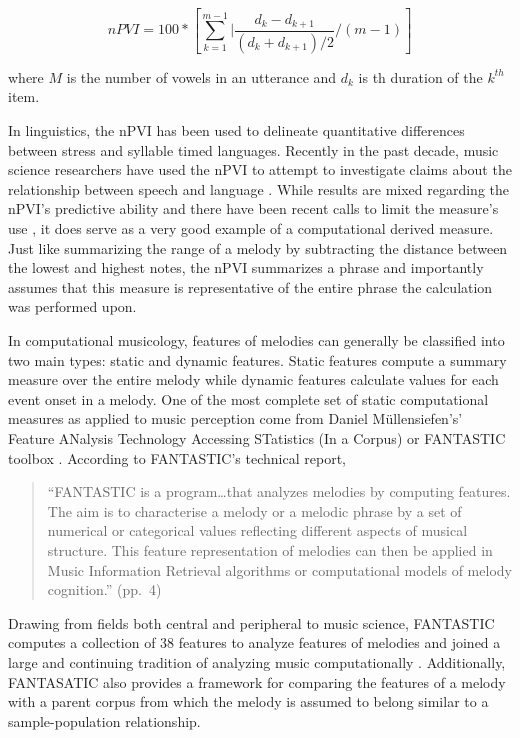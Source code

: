 \documentclass[]{book}
\begin{document}
\[nPVI = 100 * [\sum_{k=1}^{m-1} | \frac{d_k - d_{k+1}}{(d_k + d_{k+1})/2}/(m-1)] \]

where \(M\) is the number of vowels in an utterance and \(d_k\) is th duration of the \(k^{th}\) item. \citep{vanhandelRoleMeterCompositional2010}

In linguistics, the nPVI has been used to delineate quantitative differences between stress and syllable timed languages.
Recently in the past decade, music science researchers have used the nPVI to attempt to investigate claims about the relationship between speech and language \citep{danieleINTERPLAYLINGUISTICHISTORICAL2004, patelStressTimedVsSyllableTimed2003, vanhandelRoleMeterCompositional2010}.
While results are mixed regarding the nPVI's predictive ability and there have been recent calls to limit the measure's use \citep{condit-schultzDeconstructingNPVIMethodological2019}, it does serve as a very good example of a computational derived measure.
Just like summarizing the range of a melody by subtracting the distance between the lowest and highest notes, the nPVI summarizes a phrase and importantly assumes that this measure is representative of the entire phrase the calculation was performed upon.

In computational musicology, features of melodies can generally be classified into two main types: static and dynamic features.
Static features compute a summary measure over the entire melody while dynamic features calculate values for each event onset in a melody.
One of the most complete set of static computational measures as applied to music perception come from Daniel Müllensiefen's' Feature ANalysis Technology Accessing STatistics (In a Corpus) or FANTASTIC toolbox \citep{mullensiefenFantasticFeatureANalysis2009}.
According to FANTASTIC's technical report,

\begin{quote}
``FANTASTIC is a program\ldots{}that analyzes melodies by computing features. The aim is to characterise a melody or a melodic phrase by a set of numerical or categorical values reflecting different aspects of musical structure. This feature representation of melodies can then be applied in Music Information Retrieval algorithms or computational models of melody cognition.'' (pp.~4)
\end{quote}

Drawing from fields both central and peripheral to music science, FANTASTIC computes a collection of 38 features to analyze features of melodies and joined a large and continuing tradition of analyzing music computationally \citetext{\citealp[ ]{lomaxCantometricsApproachAnthropology1977}; \citealp{eerolaExpectancySamiYoiks2009}; \citealp{huronHumdrumToolkitReference1994}; \citealp{lartillotMatlabToolboxMusical2007}; \citealp{lomaxCantometricsApproachAnthropology1977}; \citealp{mcfeeLibrosaAudioMusic2015}; \citealp{steinbeckStrukturUndAhnlichkeit1982}}.
Additionally, FANTASATIC also provides a framework for comparing the features of a melody with a parent corpus from which the melody is assumed to belong similar to a sample-population relationship.
\end{document}
